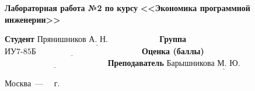 \begin{titlepage}
	\begin{center}
		\Large\textbf{Лабораторная работа №2 по курсу}
		\Large\textbf{\hspace*{38pt}<<Экономика программной инженерии>>}\newline\newline\newline
	\end{center}
	
	\noindent\textbf{Студент} $\underline{\text{Прянишников А. Н.~~~~~~~~~~~~~~~~~~}}$\newline\newline
	\noindent\textbf{Группа} $\underline{\text{ИУ7-85Б~~~~~~~~~~~~~~~~~~~~~~~~~~~~~~~~~~~~~~}}$\newline\newline
	\noindent\textbf{Оценка (баллы)} $\underline{\text{~~~~~~~~~~~~~~~~~~~~~~~~~~~~~~~~~~~~~}}$\newline\newline
	\noindent\textbf{Преподаватель} $\underline{\text{Барышникова~М.~Ю.~~~~~~~~~~~~~~~}}$\newline
	
	\begin{center}
		\vfill
		Москва~---~\the\year
		~г.
	\end{center}
	\restoregeometry
\end{titlepage}